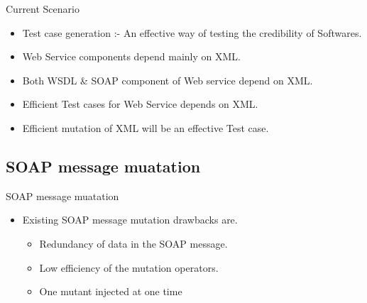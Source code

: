 \documentclass{bredelebeamer}
\begin{document}
\begin{frame}{Current Scenario}
	\begin{itemize}
		\large
		\item Test case generation :- An effective way of testing the credibility of Softwares.
		\newline
		\item Web Service components depend mainly on XML.
		\newline
		\item Both WSDL \& SOAP component of Web service depend on XML.  
		\newline
		\item Efficient Test cases for Web Service depends on XML.
		\newline
		\item Efficient mutation of XML will be an effective Test case.  
		\newline
	\end{itemize}
\end{frame}

\subsection{SOAP message muatation}
\begin{frame}{SOAP message muatation}
	\begin{itemize}
		\large
		\item Existing SOAP message mutation drawbacks are.
		\newline
		\begin{itemize}
			\large
			\item Redundancy of data in the SOAP message.
			\newline
			\item Low efficiency of the mutation operators.
			\newline
			\item  One mutant injected
			at one time
			\newline
		\end{itemize} 
	\end{itemize}
\end{frame}
\end{document}
